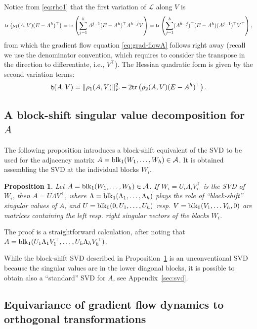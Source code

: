 \documentclass{article}
\newtheorem{proposition}{Proposition}
\def\tr{{\rm tr}}
\def\block{{\rm blk}}
\newcommand{\1}{\mathds{1}}
\newcommand{\beq}{\begin{equation}}
\newcommand{\eeq}{\end{equation}}
\begin{document}
Notice from \eqref{eq:rho1} that the first variation of $ \mathcal{L} $ along $ V$ is 
\[
\tr \left( \rho_1(A, V) (E - A^h)^\top \right) = 
\tr \left( \sum_{j=1}^h A^{j-1}  (E - A^h)^\top A^{h-j} V \right) =
\tr \left( \sum_{j=1}^h ( A^{h-j})^\top  (E - A^h) ( A^{j-1} )^\top V^\top \right) ,
\]
from which the gradient flow equation \eqref{eq:grad-flowA} follows right away (recall we use the denominator convention, which requires to consider the transpose in the direction to differentiate, i.e., $ V^\top$).
The Hessian quadratic form is given by the second variation terms:
\beq
\mathfrak{h}(A,V) =  \| \rho_1(A,V)\|_F^2 - 2 \tr \left( \rho_2(A,V) (E - A^h)^\top \right).
\label{eq:hess-quadr-form}
\eeq


\subsection{A block-shift singular value decomposition for $A$}
\label{sec:block-shift-svd}

The following proposition introduces a block-shift equivalent of the SVD to be used for the adjacency matrix $ A = \block_1(W_1, \ldots , W_h)\in \mathcal{A} $. It is obtained assembling the SVD at the individual blocks $ W_i $. 


\begin{proposition}
\label{prop:svdA2}
Let $ A= \block_1(W_1, \ldots , W_h)\in \mathcal{A} $. If $ W_i = U_i \Lambda_i V_i^\top $ is the SVD of $W_i $, then $A = U \Lambda V^\top $, where $ \Lambda=\block_1( \Lambda_1, \ldots, \Lambda_h) $ plays the role of ``block-shift'' singular values of $A$, and $ U =\block_0(0, U_1, \ldots, U_h ) $ resp. $ V=\block_0(V_1, \ldots V_h, 0 ) $ are matrices containing the left resp. right singular vectors of the blocks $ W_i$. 
\end{proposition}

The proof is a straightforward calculation, after noting that $ A =\block_1 (U_1 \Lambda_1 V_1^\top, \ldots, U_h \Lambda_h V_h^\top ) $.

While the block-shift SVD described in Proposition~\ref{prop:svdA2} is an unconventional SVD because the singular values are in the lower diagonal blocks, it is possible to obtain also a ``standard'' SVD for $A$, see Appendix~\ref{sec:svd}. 


\subsection{Equivariance of gradient flow dynamics to orthogonal transformations}
\end{document}
